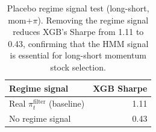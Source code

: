 \begin{table}[H]
\centering
\small
\begin{tabular}{l r}
\toprule
Regime signal & XGB Sharpe \\
\midrule
Real $\pi_t^{\text{filter}}$ (baseline) & 1.11 \\
No regime signal & 0.43 \\
\bottomrule
\end{tabular}
\caption{Placebo regime signal test (long-short, mom+$\pi$). Removing the regime signal reduces XGB's Sharpe from 1.11 to 0.43, confirming that the HMM signal is essential for long-short momentum stock selection.}
\label{tab:placebo}
\end{table}